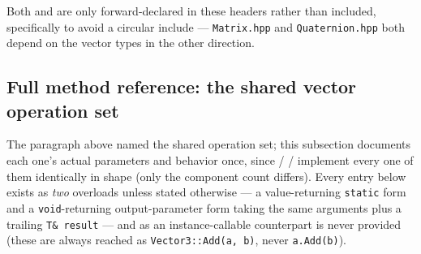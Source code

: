 Both  and  are only forward-declared in these headers
rather than included, specifically to avoid a circular include --- \texttt{Matrix.hpp} and
\texttt{Quaternion.hpp} both depend on the vector types in the other direction.

\subsection{Full method reference: the shared vector operation set}
\label{sec:vector-full-reference}

The paragraph above named the shared operation set; this subsection documents each one's
actual parameters and behavior once, since  / /%
 implement every one of them identically in shape (only the component count
differs). Every entry below exists as \emph{two} overloads unless stated otherwise --- a
value-returning \texttt{static} form and a \texttt{void}-returning output-parameter form taking
the same arguments plus a trailing \texttt{T\& result} --- and as an instance-callable
counterpart is never provided (these are always reached as \texttt{Vector3::Add(a, b)}, never
\texttt{a.Add(b)}).

